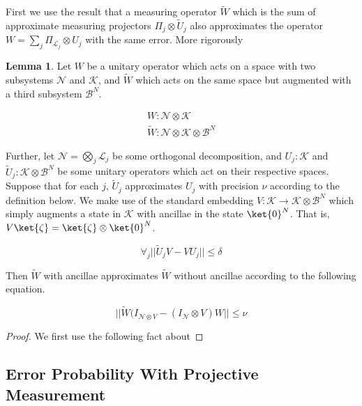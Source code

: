 \documentclass{article}
\theoremstyle{definition} \newtheorem{lemma}{Lemma}
\theoremstyle{definition} \newtheorem{theorem}{Theorem}
\begin{document}
First we use the result that a measuring operator $\tilde{W}$
which is the sum of
approximate measuring projectors $\Pi_j \otimes \tilde{U}_j$
also approximates the operator $W = \sum_{j} \Pi_{\mathcal{L}_j} \otimes U_j$
with the same error. More rigorously

\begin{lemma}
\label{lemma:error-sum}
Let $W$ be a unitary operator which acts on a space with two subsystems
$\mathcal{N}$ and $\mathcal{K}$, and $\tilde{W}$ which acts on the same space
but augmented with a third subsystem $\mathcal{B}^N$.

\begin{eqnarray}
W : \mathcal{N} \otimes \mathcal{K}\\
\tilde{W} : \mathcal{N} \otimes \mathcal{K} \otimes \mathcal{B}^N
\end{eqnarray}

Further, let $\mathcal{N} = \bigotimes_{j} \mathcal{L}_j$
be some orthogonal decomposition, and $U_j : \mathcal{K}$ and 
$\tilde{U}_j : \mathcal{K} \otimes \mathcal{B}^N$ be some unitary operators
which act on their respective spaces. Suppose that for each $j$,
$\tilde{U}_j$ approximates $U_j$ with precision $\nu$ according to the
definition below. We make use of the standard embedding
$V:\mathcal{K} \rightarrow \mathcal{K} \otimes \mathcal{B}^N$ which simply
augments a state in $\mathcal{K}$ with ancillae in the state $\ket{0}^N$.
That is, $V\ket{\zeta} = \ket{\zeta} \otimes \ket{0}^N$.

\begin{equation}
\forall_j || \tilde{U}_j V - V U_j || \le \delta
\end{equation}

Then $\tilde{W}$ with ancillae approximates $\tilde{W}$ without ancillae
according to the following equation.

\begin{equation}
|| \tilde{W} (I_{\mathcal{N} \otimes V} - (I_{\mathcal{N}} \otimes V) W || \le \nu
\end{equation}

\end{lemma}

\begin{proof}
We first use the following fact about 
\end{proof}

\subsection{Error Probability With Projective Measurement}
\label{subsec:error-proj}



\end{document}
